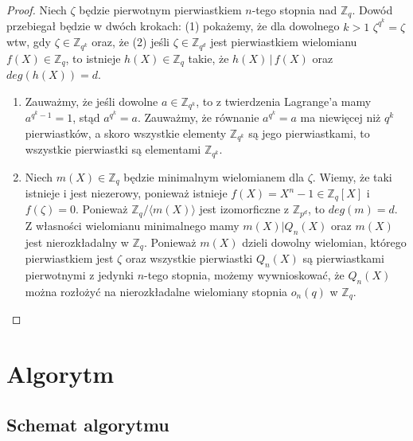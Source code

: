 \documentclass[declaration,shortabstract]{iithesis}
\theoremstyle{definition}
\theoremstyle{remark} \newtheorem{observation}{Obserwacja}
\theoremstyle{plain} \newtheorem{theorem}{Twierdzenie}
\theoremstyle{plain} \newtheorem{lemma}{Lemat}
\theoremstyle{remark} \newtheorem*{remark*}{Uwaga}
\theoremstyle{reminder} \newtheorem*{reminder*}{Przypomnienie}
\begin{document}
\begin{proof}
    Niech $\zeta$ będzie pierwotnym pierwiastkiem $n$-tego stopnia nad $\mathbb{Z}_q$. Dowód przebiegał będzie w dwóch krokach: (1) pokażemy, że dla dowolnego $k > 1$ $\zeta^{q^k}=\zeta$ wtw, gdy $\zeta \in \mathbb{Z}_{q^k}$ oraz, że (2) jeśli $\zeta \in \mathbb{Z}_{q^d}$ jest pierwiastkiem wielomianu $f(X) \in \mathbb{Z}_q$, to istnieje $h(X) \in \mathbb{Z}_q$ takie, że $h(X) \, | \, f(X)$ oraz $deg(h(X)) = d$.\newline
    \begin{enumerate}[label=(\arabic*),leftmargin=.4in]
        \item Zauważmy, że jeśli dowolne $a \in \mathbb{Z}_{q^k}$, to z twierdzenia Lagrange'a mamy $a^{q^k-1} = 1$, stąd $a^{q^k} = a$. Zauważmy, że równanie $a^{q^k} = a$ ma niewięcej niż $q^k$ pierwiastków, a skoro wszystkie elementy $\mathbb{Z}_{q^k}$ są jego pierwiastkami, to wszystkie pierwiastki są elementami $\mathbb{Z}_{q^k}$.
        \item Niech $m(X) \in \mathbb{Z}_q$ będzie minimalnym wielomianem dla $\zeta$. Wiemy, że taki istnieje i jest niezerowy, ponieważ istnieje $f(X) = X^{n} - 1 \in \mathbb{Z}_q[X]$ i $f(\zeta) = 0$. Ponieważ $\mathbb{Z}_q / \langle m(X) \rangle$ jest izomorficzne z $\mathbb{Z}_{p^d}$, to $deg(m) = d$. Z własności wielomianu minimalnego mamy $m(X) | Q_n(X)$ oraz $m(X)$ jest nierozkładalny w $\mathbb{Z}_q$. \newline 
        Ponieważ $m(X)$ dzieli dowolny wielomian, którego pierwiastkiem jest $\zeta$ oraz wszystkie pierwiastki $Q_n(X)$ są pierwiastkami pierwotnymi z jedynki $n$-tego stopnia, możemy wywnioskować, że $Q_n(X)$ można rozłożyć na nierozkładalne wielomiany stopnia $o_n(q)$ w $\mathbb{Z}_q$.
    \end{enumerate}
\end{proof}
	
\chapter{Algorytm}
	
\section{Schemat algorytmu}
	
\end{document}
